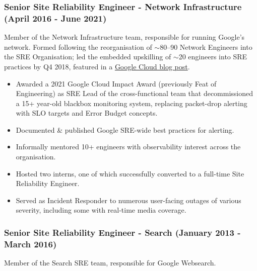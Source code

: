 \documentclass[a4paper, 10pt] {article}
\begin{document}
\newpage %

\subsubsection*{Senior Site Reliability Engineer - Network Infrastructure (April 2016 - June 2021)}

Member of the Network Infrastructure team, responsible for running Google's network. Formed following the reorganisation of $\sim$80--90 Network Engineers into the SRE Organisation; led the embedded upskilling of $\sim$20 engineers into SRE practices by Q4 2018, featured in a \href{https://cloud.google.com/blog/products/management-tools/transitioning-a-typical-engineering-ops-team-into-an-sre-powerhouse}{Google Cloud blog post}.

\begin{itemize}[noitemsep]
	\item Awarded a 2021 Google Cloud Impact Award (previously Feat of Engineering) as SRE Lead of the cross-functional team that
		decommissioned a 15+ year-old blackbox monitoring system, replacing packet-drop alerting with SLO targets and Error Budget concepts.
	\item Documented \& published Google SRE-wide best practices for alerting.
	\item Informally mentored 10+ engineers with observability interest across the organisation.
	\item Hosted two interns, one of which successfully converted to a full-time Site Reliability Engineer.
	\item Served as Incident Responder to numerous user-facing outages of various severity, including some with real-time media coverage.
\end{itemize}

\subsubsection*{Senior Site Reliability Engineer - Search (January 2013 - March 2016)}

Member of the Search SRE team, responsible for Google Websearch.
\end{document}
